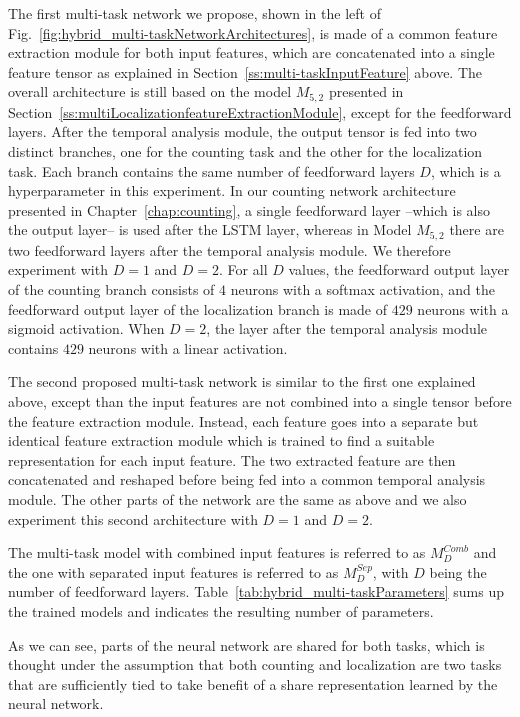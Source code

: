 The first multi-task network we propose, shown in the left of  Fig.~\ref{fig:hybrid_multi-taskNetworkArchitectures}, is made of a common feature extraction module for both input features, which are concatenated into a single feature tensor as explained in Section~\ref{ss:multi-taskInputFeature} above. The overall architecture is still based on the model $M_{5,2}$ presented in Section~\ref{ss:multiLocalizationfeatureExtractionModule}, except for the feedforward layers. After the temporal analysis module, the output tensor is fed into two distinct branches, one for the counting task and the other for the localization task. Each branch contains the same number of feedforward layers $D$, which is a hyperparameter in this experiment. In our counting network architecture presented in Chapter~\ref{chap:counting}, a single feedforward layer --which is also the output layer-- is used after the LSTM layer, whereas in Model $M_{5,2}$ there are two feedforward layers after the temporal analysis module. We therefore experiment with $D=1$ and $D=2$. For all $D$ values, the feedforward output layer of the counting branch consists of $4$ neurons with a softmax activation, and the feedforward output layer of the localization branch is made of $429$ neurons with a sigmoid activation. When $D=2$, the layer after the temporal analysis module contains $429$ neurons with a linear activation.

The second proposed multi-task network is similar to the first one explained above, except than the input features are not combined into a single tensor before the feature extraction module. Instead, each feature goes into a separate but identical feature extraction module which is trained to find a suitable representation for each input feature. The two extracted feature are then concatenated and reshaped before being fed into a common temporal analysis module. The other parts of the network are the same as above and we also experiment this second architecture with $D=1$ and $D=2$.

The multi-task model with combined input features is referred to as $M^{Comb}_D$ and the one with separated input features is referred to as  $M^{Sep}_D$, with $D$ being the number of feedforward layers. Table~\ref{tab:hybrid_multi-taskParameters} sums up the trained models and indicates the resulting number of parameters.

As we can see, parts of the neural network are shared for both tasks, which is thought under the assumption that both counting and localization are two tasks that are sufficiently tied to take benefit of a share representation learned by the neural network.

